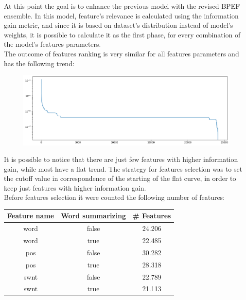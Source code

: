 At this point the goal is to enhance the previous model with the revised BPEF ensemble. In this model, feature's relevance is calculated using the information gain metric, and since it is based on dataset's distribution instead of model's weights, it is possible to calculate it as the first phase, for every combination of the model's features parameters.\\
The outcome of features ranking is very similar for all features parameters and has the following trend:

\begin{figure}[ht]
	\centering
	\includegraphics[width=\textwidth]{figures/conf_matrices/twitter_snt_bpef/bpef_fs_1.png}
	\label{fig:twitter_bpef_fs_1}
\end{figure}

It is possible to notice that there are just few features with higher information gain, while most have a flat trend. The strategy for features selection was to set the cutoff value in correspondence of the starting of the flat curve, in order to keep just features with higher information gain.\\
Before features selection it were counted the following number of features:

\begin{center}
	\begin{tabular}{ c  c  c } 
		\hline
		\textbf{Feature name} & \textbf{Word summarizing} & \textbf{\# Features} \\
		\hline
		word & false & 24.206 \\ 
		\hline
		word & true & 22.485 \\ 
		\hline
		pos & false & 30.282 \\ 
		\hline
		pos & true & 28.318 \\ 
		\hline
		swnt & false & 22.789 \\ 
		\hline
		swnt & true & 21.113 \\ 
		\hline
	\end{tabular}
\end{center}

